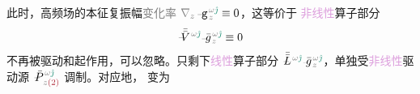 此时，\textcolor{NavyBlue}{高频场}的\textcolor{PineGreen}{本征复振幅}\textcolor{gray}{变化率} $\mathcolor{gray}{\nabla_z} \xint{\begin{smallmatrix} ~ \\ {}^{}_{\mathcolor{gray}{-}} \\ ~ \end{smallmatrix}}{09}{\mathtt{g}}^{\;\!\mathcolor{gray}{\omega} \textcolor{PineGreen}{\hat{\jmath}}}_{\;\! \mathcolor{gray}{z}} \equiv 0$，这等价于 \textcolor{Plum}{非线性}算子部分
\begin{align} \label{eq:label}
 \xint{\mathcolor{gray}{-}}{21}{\bar{\bar{V}}}^{\;\! \mathcolor{gray}{\omega} \textcolor{PineGreen}{\hat{\jmath}}} \xint{{}^{}_{\mathcolor{gray}{-}}}{10}{\bar{g}}^{\;\!\mathcolor{gray}{\omega} \textcolor{PineGreen}{\hat{\jmath}}}_{\;\! \mathcolor{gray}{z}} \equiv 0
\end{align} 
不再被驱动和起作用，可以忽略。只剩下\textcolor{Plum}{线性}算子部分 $\xint{\mathcolor{gray}{-}}{30}{\bar{\bar{L}}}^{\;\! \mathcolor{gray}{\omega} \textcolor{PineGreen}{\hat{\jmath}}} \xint{{}^{}_{\mathcolor{gray}{-}}}{10}{\bar{g}}^{\;\!\mathcolor{gray}{\omega} \textcolor{PineGreen}{\hat{\jmath}}}_{\;\! \mathcolor{gray}{z}}$，单独受\textcolor{Plum}{非线性}\textcolor{NavyBlue}{驱动源} $\xint{\mathcolor{gray}{-}}{25}{\bar{P}}^{\;\! \mathcolor{gray}{\omega} \textcolor{PineGreen}{\hat{\jmath}}}_{\;\! \mathcolor{gray}{z} \textcolor{Maroon}{(2)}}$ 调制。对应地， 变为
